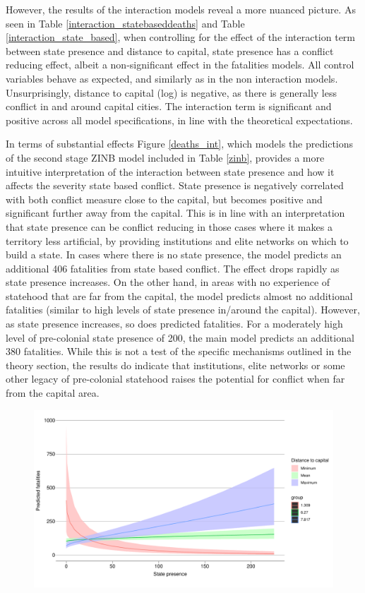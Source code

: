 \documentclass[12pt]{article}
\begin{document}
However, the results of the interaction models reveal a more nuanced picture. As
seen in Table \ref{interaction_statebaseddeaths} and Table
\ref{interaction_state_based}, when controlling for the effect of the
interaction term between state presence and distance to capital, state presence
has a conflict reducing effect, albeit a non-significant effect in the
fatalities models. All control variables behave as expected, and similarly as in
the non interaction models. Unsurprisingly, distance to capital (log) is
negative, as there is generally less conflict in and around capital cities. The
interaction term is significant and positive across all model specifications, in
line with the theoretical expectations. 

In terms of substantial effects Figure \ref{deaths_int}, which models the
predictions of the second stage ZINB model included in Table \ref{zinb},
provides a more intuitive interpretation of the interaction between state
presence and how it affects the severity state based conflict. State presence is
negatively correlated with both conflict measure close to the capital, but
becomes positive and significant further away from the capital. This is in line
with an interpretation that state presence can be conflict reducing in those
cases where it makes a territory less artificial, by providing institutions and
elite networks on which to build a state. In cases where there is no state
presence, the model predicts an additional 406 fatalities from state based
conflict. The effect drops rapidly as state presence increases. On the other
hand, in areas with no experience of statehood that are far from the capital,
the model predicts almost no additional fatalities (similar to high levels of
state presence in/around the capital). However, as state presence increases, so
does predicted fatalities. For a moderately high level of pre-colonial state
presence of 200, the main model predicts an additional 380 fatalities. While
this is not a test of the specific mechanisms outlined in the theory section,
the results do indicate that institutions, elite networks or some other legacy
of pre-colonial statehood raises the potential for conflict when far from the
capital area.


\begin{figure}[htpb]
	\centering
	\includegraphics[width=\linewidth]{"../R/Output/zinbplot.pdf"}
	\caption{}
	\label{deaths_zinb}
\end{figure}
\end{document}
